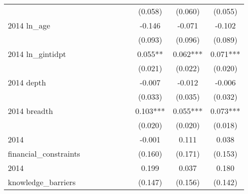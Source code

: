 \begin{table}[htbp]
\begin{tabular}{l*{9}{c}}
                    &               &               &               &               &               &               &     (0.058)   &     (0.060)   &     (0.055)   \\
2014 ln\_age         &               &               &               &               &               &               &      -0.146   &      -0.071   &      -0.102   \\
                    &               &               &               &               &               &               &     (0.093)   &     (0.096)   &     (0.089)   \\
2014 ln\_gintidpt    &               &               &               &               &               &               &       0.055** &       0.062***&       0.071***\\
                    &               &               &               &               &               &               &     (0.021)   &     (0.022)   &     (0.020)   \\
2014 depth          &               &               &               &               &               &               &      -0.007   &      -0.012   &      -0.006   \\
                    &               &               &               &               &               &               &     (0.033)   &     (0.035)   &     (0.032)   \\
2014 breadth        &               &               &               &               &               &               &       0.103***&       0.055***&       0.073***\\
                    &               &               &               &               &               &               &     (0.020)   &     (0.020)   &     (0.018)   \\
2014                &               &               &               &               &               &               &      -0.001   &       0.111   &       0.038   \\
financial\_constraints&               &               &               &               &               &               &     (0.160)   &     (0.171)   &     (0.153)   \\
2014                &               &               &               &               &               &               &       0.199   &       0.037   &       0.180   \\
knowledge\_barriers  &               &               &               &               &               &               &     (0.147)   &     (0.156)   &     (0.142)   \\

\end{tabular}
\end{table}
